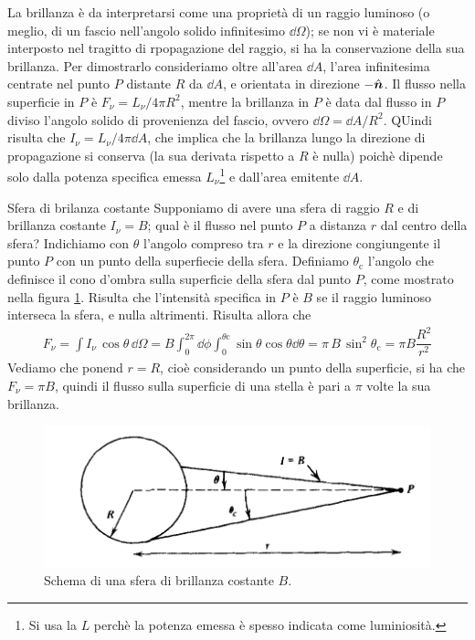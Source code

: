 La brillanza è da interpretarsi come una proprietà di un raggio luminoso (o meglio, di un fascio nell'angolo solido infinitesimo $\dd\Omega$); se non vi è materiale interposto nel tragitto di rpopagazione del raggio, si ha la conservazione della sua brillanza. Per dimostrarlo consideriamo oltre all'area $\dd A$, l'area infinitesima centrate nel punto $P$ distante $R$ da $\dd A$, e orientata in direzione $-\vers{n}$. Il flusso nella superficie in $P$ è $F_\nu = L_\nu /4\pi R^2$, mentre la brillanza in $P$ è data dal flusso in $P$ diviso l'angolo solido di provenienza del fascio, ovvero $\dd \Omega = \dd A /R^2$. QUindi risulta che $I_\nu = L_\nu /4\pi \dd A$, che implica che la brillanza lungo la direzione di propagazione si conserva (la sua derivata rispetto a $R$ è nulla) poichè dipende solo dalla potenza specifica emessa $L_\nu$\footnote{Si usa la $L$ perchè la potenza emessa è spesso indicata come luminiosità.} e dall'area emitente $\dd A$. 

\begin{Example}{Sfera di brilanza costante}
Supponiamo di avere una sfera di raggio $R$ e di brillanza costante $I_\nu = B$; qual è il flusso nel punto $P$ a distanza $r$ dal centro della sfera? Indichiamo con $\theta$ l'angolo compreso tra $r$ e la direzione congiungente il punto $P$ con un punto della superfiecie della sfera. Definiamo $\theta_\mathrm{c}$ l'angolo che definisce il cono d'ombra sulla superficie della sfera dal punto $P$, come mostrato nella figura \ref{fig:Sfera}. Risulta che l'intensità specifica in $P$ è $B$ se il raggio luminoso interseca la sfera, e nulla altrimenti.
Risulta allora che 
\begin{align*}
F_\nu = \int I_\nu \,\cos \theta \,\dd \Omega = B \int_{0}^{2\pi} \dd \phi \int_{0}^{\theta\mathrm{c}} \sin\theta \cos\theta \dd \theta = \pi\, B \, \sin^2\theta_\mathrm{c} = \pi B \dfrac{R^2}{r^2}
\end{align*}
Vediamo che ponend $r=R$, cioè considerando un punto della superficie, si ha che $F_\nu=\pi B$, quindi il flusso sulla superficie di una stella è pari a $\pi$ volte la sua brillanza.
\end{Example}
\begin{figure}
\includegraphics[width=\textwidth]{img/Brillanza_Sfera}
\caption{Schema di una sfera di brillanza costante $B$.} \label{fig:Sfera}
\end{figure}

